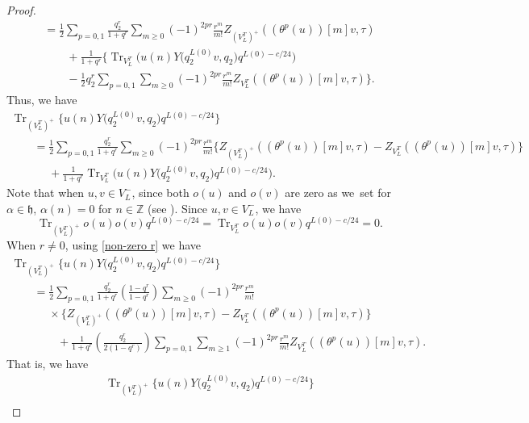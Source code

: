 \documentclass[pdftex]{sigma}
\numberwithin{equation}{section}
\theoremstyle{definition}
\begin{document}
\begin{proof}
\begin{gather*}
=\frac{1}{2}\sum_{p=0,1}\frac{q_2^r}{1+q^r}\sum_{m\geq 0}(-1)^{2pr}\frac{r^m}{m!}Z_{(V_L^T)^+}((\theta^p(u))[m]v, \tau)\\
\qquad{}+\frac{1}{1+q^r}\biggl\{\operatorname{Tr}_{V_L^T}\bigl( u(n)Y\bigl(q_2^{L(0)}v, q_2\bigr)q^{L(0)-c/24}\bigr)\\
\qquad{}-\frac{1}{2}q_2^r\sum_{p=0,1}\sum_{m\geq 0}(-1)^{2pr}\frac{r^m}{m!}Z_{V_L^T}((\theta^p(u))[m]v, \tau)\biggr\}.
\end{gather*}
Thus, we have
\begin{gather*}
\operatorname{Tr}_{(V_L^T)^+}\bigl\{u(n) Y\bigl(q_2^{L(0)}v,q_2\bigr)q^{L(0)-c/24}\bigr\}\\
\qquad=\frac{1}{2}\sum_{p=0,1}\frac{q_2^r}{1+q^r}\sum_{m\geq 0}(-1)^{2pr}\frac{r^m}{m!}\bigl\{Z_{(V_L^T)^+}((\theta^p(u))[m]v, \tau)-Z_{V_L^T}((\theta^p(u))[m]v, \tau)\bigr\}\\
\phantom{\qquad=}{}+\frac{1}{1+q^r}\operatorname{Tr}_{V_L^T}\bigl( u(n)Y\bigl(q_2^{L(0)}v, q_2\bigr)q^{L(0)-c/24}\bigr).
\end{gather*}
Note that when $u,v\in V_L^-$,  since both $o(u)$ and $o(v)$ are zero as we~set for $\alpha\in \mathfrak{h}$, $\alpha(n)=0$ for $n\in \mathbb{Z}$ (see \cite[equation (9.1.13)]{Frenkel1988VertexMonster}).
Since $u,v\in V_L^-$, we have
\begin{equation}\label{r=0 twisted +}
 \operatorname{Tr}_{(V_L^T)^+}o(u)o(v)q^{L(0)-c/24}=\operatorname{Tr}_{V_L^T}o(u)o(v)q^{L(0)-c/24}=0.
\end{equation}
When $r\neq 0$, using \eqref{non-zero r} we have
\begin{gather*}
\operatorname{Tr}_{(V_L^T)^+}\bigl\{u(n) Y\bigl(q_2^{L(0)}v,q_2\bigr)q^{L(0)-c/24}\bigr\}\\
\qquad
=\frac{1}{2}\sum_{p=0,1}\frac{q_2^r}{1+q^r}\left(\frac{1-q^r}{1-q^r}\right)\sum_{m\geq 0}(-1)^{2pr}\frac{r^m}{m!}\phantom{\qquad
=}{}\\
\phantom{\qquad
=}{}\times\bigl\{Z_{(V_L^T)^+}((\theta^p(u))[m]v, \tau)-Z_{V_L^T}((\theta^p(u))[m]v, \tau)\bigr\}\\
\phantom{\qquad
=\times}{}+\frac{1}{1+q^r}\left(\frac{q_2^r}{2(1-q^r)}\right)\sum_{p=0,1}\sum_{m\geq 1}(-1)^{2pr}\frac{r^m}{m!}Z_{V_L^T}((\theta^p(u))[m]v, \tau).
\end{gather*}
That is, we have
\begin{gather*}
\operatorname{Tr}_{(V_L^T)^+}\bigl\{u(n) Y\bigl(q_2^{L(0)}v,q_2\bigr)q^{L(0)-c/24}\bigr\}\\

\end{gather*}
\end{proof}
\end{document}
